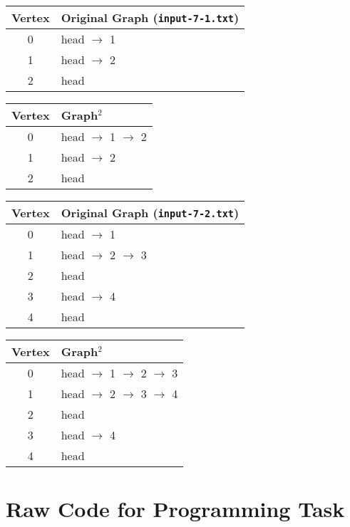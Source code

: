 \documentclass[11pt]{article}
\begin{document}
\begin{center}

\begin{tabular}{|c|l|}
\hline
\textbf{Vertex} & \textbf{Original Graph (\texttt{input-7-1.txt})} \\
\hline
0 & head $\rightarrow$ 1 \\
1 & head $\rightarrow$ 2 \\
2 & head \\
\hline
\end{tabular}
\hspace{1cm}
\begin{tabular}{|c|l|}
\hline
\textbf{Vertex} & \textbf{Graph\(^2\)} \\
\hline
0 & head $\rightarrow$ 1 $\rightarrow$ 2 \\
1 & head $\rightarrow$ 2 \\
2 & head \\
\hline
\end{tabular}

\vspace{1.5em}

\begin{tabular}{|c|l|}
\hline
\textbf{Vertex} & \textbf{Original Graph (\texttt{input-7-2.txt})} \\
\hline
0 & head $\rightarrow$ 1 \\
1 & head $\rightarrow$ 2 $\rightarrow$ 3 \\
2 & head \\
3 & head $\rightarrow$ 4 \\
4 & head \\
\hline
\end{tabular}
\hspace{1cm}
\begin{tabular}{|c|l|}
\hline
\textbf{Vertex} & \textbf{Graph\(^2\)} \\
\hline
0 & head $\rightarrow$ 1 $\rightarrow$ 2 $\rightarrow$ 3 \\
1 & head $\rightarrow$ 2 $\rightarrow$ 3 $\rightarrow$ 4 \\
2 & head \\
3 & head $\rightarrow$ 4 \\
4 & head \\
\hline
\end{tabular}

\end{center}


\newpage
\section*{Raw Code for Programming Task}
\end{document}
